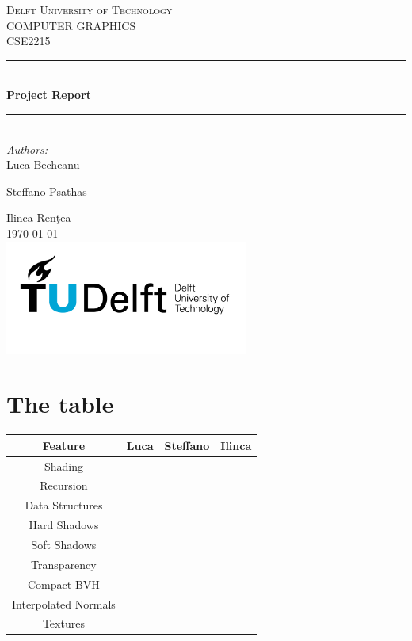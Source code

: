 \documentclass[a4paper]{article}
\begin{document}
\begin{titlepage}

\newcommand{\HRule}{\rule{\linewidth}{0.5mm}} 							%
\center 
 
\textsc{\LARGE Delft University of Technology}\\[1cm]

\textsc{\Large COMPUTER GRAPHICS}\\[0.2cm]
\textsc{\large CSE2215}\\[1cm] 										%
\HRule \\[0.8cm]
{ \huge \bfseries Project Report}\\[0.7cm]								%
\HRule \\[2cm]
\large
\emph{Authors:}\\
Luca Becheanu

Steffano Psathas

Ilinca Renţea \\[1.5cm]
{\large \today}\\[5cm]
\includegraphics[width=0.6\textwidth]{images/TU_delft_logo.jpg}\\[1cm] 	%
\vfill 
\end{titlepage}

\section*{The table}

\begin{table}[htp]
\begin{tabular}{|c|c|c|c|}
\hline
Feature              & Luca & Steffano & Ilinca \\ \hline
Shading              &      &          &        \\ \hline
Recursion            &      &          &        \\ \hline
Data Structures      &      &          &        \\ \hline
Hard Shadows         &      &          &        \\ \hline
Soft Shadows         &      &          &        \\ \hline
Transparency         &      &          &        \\ \hline
Compact BVH          &      &          &        \\ \hline
Interpolated Normals &      &          &        \\ \hline
Textures             &      &          &        \\ \hline
\end{tabular}
\end{table}


\end{document}
